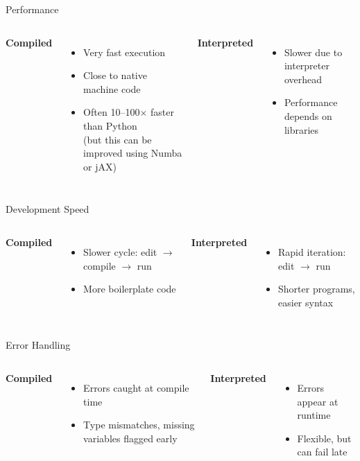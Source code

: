 \begin{frame}{Performance}
	\begin{columns}[T]
		\textbf{Compiled}
		\begin{itemize}
			\item Very fast execution
			\item Close to native machine code
			\item Often 10--100$\times$ faster than Python \\ (but this can be improved using Numba or jAX)
		\end{itemize}
		
		\textbf{Interpreted}
		\begin{itemize}
			\item Slower due to interpreter overhead
			\item Performance depends on libraries
		\end{itemize}
	\end{columns}
\end{frame}

\begin{frame}{Development Speed}
	\begin{columns}[T]
		\textbf{Compiled}
		\begin{itemize}
			\item Slower cycle: edit $\to$ compile $\to$ run
			\item More boilerplate code
		\end{itemize}
		
		\textbf{Interpreted}
		\begin{itemize}
			\item Rapid iteration: edit $\to$ run
			\item Shorter programs, easier syntax
		\end{itemize}
	\end{columns}
\end{frame}

\begin{frame}{Error Handling}
	\begin{columns}[T]
		\textbf{Compiled}
		\begin{itemize}
			\item Errors caught at compile time
			\item Type mismatches, missing variables flagged early
		\end{itemize}
		
		\textbf{Interpreted}
		\begin{itemize}
			\item Errors appear at runtime
			\item Flexible, but can fail late
		\end{itemize}
	\end{columns}
\end{frame}

